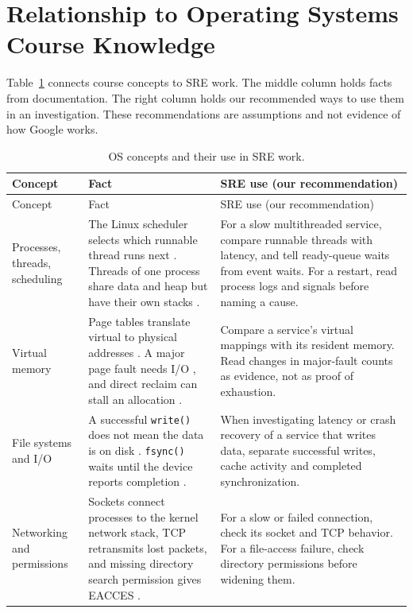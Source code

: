 \section{Relationship to Operating Systems Course Knowledge}\label{sec:concepts}

Table~\ref{tab:os} connects course concepts to SRE work. The middle column holds facts from documentation. The right column holds our recommended ways to use them in an investigation. These recommendations are assumptions and not evidence of how Google works.

\begin{longtable}{@{}>{\raggedright\arraybackslash}p{}>{\raggedright\arraybackslash}p{}>{\raggedright\arraybackslash}p{}@{}}
\caption{OS concepts and their use in SRE work.}\label{tab:os}\\
\hline
Concept & Fact & SRE use (our recommendation) \\
\hline
\endfirsthead
\hline
Concept & Fact & SRE use (our recommendation) \\
\hline
\endhead
Processes, threads, scheduling & The Linux scheduler selects which runnable thread runs next \cite{man7}. Threads of one process share data and heap but have their own stacks \cite{man7}. & For a slow multithreaded service, compare runnable threads with latency, and tell ready-queue waits from event waits. For a restart, read process logs and signals before naming a cause. \\
\hline
Virtual memory & Page tables translate virtual to physical addresses \cite{kernel-docs}. A major page fault needs I/O \cite{manpages-debian-testing-manpages-dev-getrusage-2-en-html}, and direct reclaim can stall an allocation \cite{kernel-docs}. & Compare a service's virtual mappings with its resident memory. Read changes in major-fault counts as evidence, not as proof of exhaustion. \\
\hline
File systems and I/O & A successful \texttt{write()} does not mean the data is on disk \cite{man7}. \texttt{fsync()} waits until the device reports completion \cite{man7}. & When investigating latency or crash recovery of a service that writes data, separate successful writes, cache activity and completed synchronization. \\
\hline
Networking and permissions & Sockets connect processes to the kernel network stack, TCP retransmits lost packets, and missing directory search permission gives EACCES \cite{man7}. & For a slow or failed connection, check its socket and TCP behavior. For a file-access failure, check directory permissions before widening them. \\

\end{longtable}
